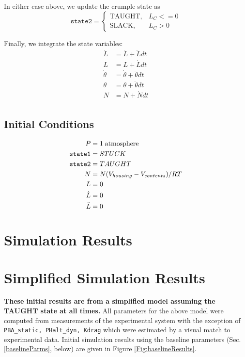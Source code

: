 \documentclass[letterpaper]{article}
\begin{document}
In either case above, we update the crumple state as
\begin{equation}
    \mathtt{state2} =
    \begin{cases}
      \mathrm{TAUGHT},  &  L_C <=0 \\
      \mathrm{SLACK},   &  L_C  > 0
    \end{cases}
\end{equation}

Finally, we integrate the state variables:
\begin{equation}
\begin{aligned}
  \dot{L} &= \dot{L} +  \ddot{L}  dt \\
  L       &= L + \dot{L}  dt \\
  \dot{\theta} &= \dot{\theta} + \ddot{\theta}dt \\
  \theta &= \theta + \dot{\theta} dt\\
  N &= N + \dot{N}  dt\\
\end{aligned}
\end{equation}


\subsection{Initial Conditions}
\begin{equation}
\begin{aligned}
  P &= 1 \; \mathrm{atmosphere}\\
  {\tt state1} &= STUCK \\
  {\tt state2} &= TAUGHT \\
  N &= N(V_{housing} - V_{contents}) / RT \\
  L &= 0\\
  \dot{L} &= 0\\
  \ddot{L} &= 0\\
\end{aligned}
\end{equation}

\section{Simulation Results}



\section{Simplified Simulation Results}
{\bf These initial results are from a simplified model assuming the TAUGHT state at all times. }
All parameters for the above model were computed from measurements of the experimental
system with the exception of {\tt PBA\_static, PHalt\_dyn, Kdrag} which were estimated
by a visual match to experimental data.
Initial simulation results using the baseline parameters (Sec. \ref{baselineParms}, below) are
given in Figure \ref{Fig:baselineResults}.
\end{document}
